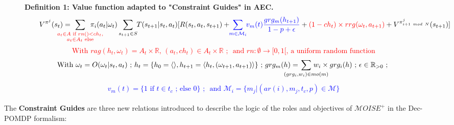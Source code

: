 \documentclass[sigconf,anonymous]{aamas}
\begin{document}
  \begin{figure*}[h!]
    \label{eq:single_value_function}
    \raggedright
    \textbf{\quad Definition 1: Value function adapted to "Constraint Guides" in AEC.}
    \begin{gather*}
      \text{\quad \quad} V^{\pi^j}(s_t) = \hspace{-0.75cm} \sum_{\textcolor{red}{ \substack{a_{t} \in A \text{ if } rn() < ch_{t}, \\ 
      a_{t} \in A_{t} \text{ else}}
      }}{\hspace{-0.7cm} \pi_i(a_{t} | \omega_t)} \sum_{s_{t+1} \in S}{\hspace{-0.1cm} T(s_{t+1} | s_t, a_{t})[R(s_t,a_{t},s_{t+1}) + \hspace{-0.1cm} \textcolor{blue}{ \sum_{m \in \mathcal{M}_i}{ \hspace{-0.1cm} v_m(t) \frac{grg_m(h_{t+1})}{1 - p + \epsilon} } } + \textcolor{red}{(1-ch_t) \times rrg(\omega_t,a_{t+1})} + V^{\pi^j_{i+1 \ mod \ N}}(s_{t+1})]}
    \end{gather*}  
    \textcolor{red}{\[\text{With } rag(h_t, \omega_t) = A_{t} \times \mathbb{R} \text{, } (a_t, ch_{t}) \in A_{t} \times \mathbb{R} \text{ ; } \text{ and } rn: \emptyset \to [0,1[ \text{, a uniform random function}\]}
    \vspace{-0.5cm}
    \textcolor{blue}{
    \begin{gather*}
    \text{With } \omega_t = O(\omega_t | s_t, a_t) \text{ ; } h_t = \{h_0 = \langle \rangle, h_{t+1} = \langle h_t, (\omega_{t+1}, a_{t+1}) \rangle \} \text{ ; } grg_m(h) = \hspace{-0.8cm} \sum_{(grg_i,w_i) \in mo(m)}{\hspace{-0.8cm} w_i \times grg_i(h)} \text{ ; } \epsilon \in \mathbb{R}_{>0} \text{ ; }
    \end{gather*}
    }
    \vspace{-0.75cm}
    \textcolor{blue}{
    \begin{gather*}
    v_m(t) = \{ 1 \text{ if } t \in t_c \text{ ; else } 0 \} \text{ ; } \text{ and } \mathcal{M}_i = \{m_j | (ar(i),m_j,t_c,p) \in \mathcal{M}\}
    \end{gather*}
    }
    \vspace{-0.6cm}
    \end{figure*}

The \textbf{Constraint Guides} \quad are three new relations introduced to describe the logic of the roles and objectives of $\mathcal{M}OISE^+$ in the Dec-POMDP formalism:
\end{document}
